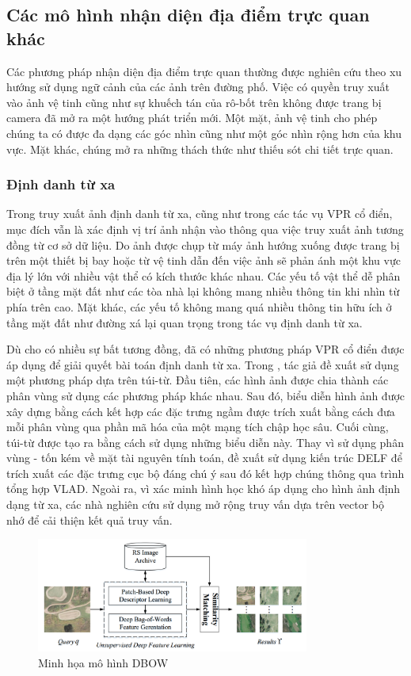 \subsection{Các mô hình nhận diện địa điểm trực quan khác}
Các phương pháp nhận diện địa điểm trực quan thường được nghiên cứu theo xu hướng sử dụng ngữ cảnh của các ảnh trên đường phố. Việc có quyền truy xuất vào ảnh vệ tinh cũng như sự khuếch tán của rô-bốt trên không được trang bị camera đã mở ra một hướng phát triển mới. Một mặt, ảnh vệ tinh cho phép chúng ta có được đa dạng các góc nhìn cũng như một góc nhìn rộng hơn của khu vực. Mặt khác, chúng mở ra những thách thức như thiếu sót chi tiết trực quan.

\subsubsection{Định danh từ xa}
Trong truy xuất ảnh định danh từ xa, cũng như trong các tác vụ VPR cổ điển, mục đích vẫn là xác định vị trí ảnh nhận vào thông qua việc truy xuất ảnh tương đồng từ cơ sở dữ liệu. Do ảnh được chụp từ máy ảnh hướng xuống được trang bị trên một thiết bị bay hoặc từ vệ tinh dẫn đến việc ảnh sẽ phản ánh một khu vực địa lý lớn với nhiều vật thể có kích thước khác nhau. Các yếu tố vật thể dễ phân biệt ở tầng mặt đất như các tòa nhà lại không mang nhiều thông tin khi nhìn từ phía trên cao. Mặt khác, các yếu tố không mang quá nhiều thông tin hữu ích ở tầng mặt đất như đường xá lại quan trọng trong tác vụ định danh từ xa.

Dù cho có nhiều sự bất tương đồng, đã có những phương pháp VPR cổ điển được áp dụng để giải quyết bài toán định danh từ xa. Trong \cite{Tang2018UnsupervisedDF}, tác giả đề xuất sử dụng một phương pháp dựa trên túi-từ. Đầu tiên, các hình ảnh được chia thành các phân vùng sử dụng các phương pháp khác nhau. Sau đó, biểu diễn hình ảnh được xây dựng bằng cách kết hợp các đặc trưng ngầm được trích xuất bằng cách đưa mỗi phân vùng qua phần mã hóa của một mạng tích chập học sâu. Cuối cùng, túi-từ được tạo ra bằng cách sử dụng những biểu diễn này. Thay vì sử dụng phân vùng - tốn kém về mặt tài nguyên tính toán, \cite{Imbriaco_2019} đề xuất sử dụng kiến trúc DELF để trích xuất các đặc trưng cục bộ đáng chú ý sau đó kết hợp chúng thông qua trình tổng hợp VLAD. Ngoài ra, vì xác minh hình học khó áp dụng cho hình ảnh định dạng từ xa, các nhà nghiên cứu sử dụng mở rộng truy vấn dựa trên vector bộ nhớ \cite{7870636} để cải thiện kết quả truy vấn.

\begin{figure}[H]
    \centering
    \includegraphics[width=0.8\textwidth]{pics/Chapter2/rsir.png}
    \caption{Minh họa mô hình DBOW \cite{Tang2018UnsupervisedDF}}
\end{figure}

